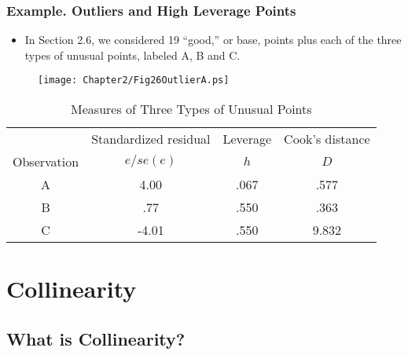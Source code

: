 \begin{frame}[shrink=2]
 \frametitle{Example. Outliers and High Leverage Points}
 \begin{itemize}
   \item In Section 2.6, we considered 19 ``good,'' or base, points plus each of the three
types of unusual points, labeled A, B and C.
    \end{itemize}
    \begin{figure}[htp]
  \begin{center}
    \texttt{[image: Chapter2/Fig26OutlierA.ps]}
  \end{center}
\end{figure}

\begin{table}[h]

\caption{Measures of Three Types of Unusual Points}
\begin{tabular}{cccc}
\hline
& Standardized residual & Leverage & Cook's distance \\
Observation & $e/se(e)$ & $h$ & $D$ \\ \hline
A & 4.00 & .067 & .577 \\
B & .77 & .550 & .363 \\
 C & -4.01 & .550 & 9.832 \\ \hline
\end{tabular}
\end{table}

\end{frame}

\section{Collinearity}

\subsection{What is Collinearity?}



